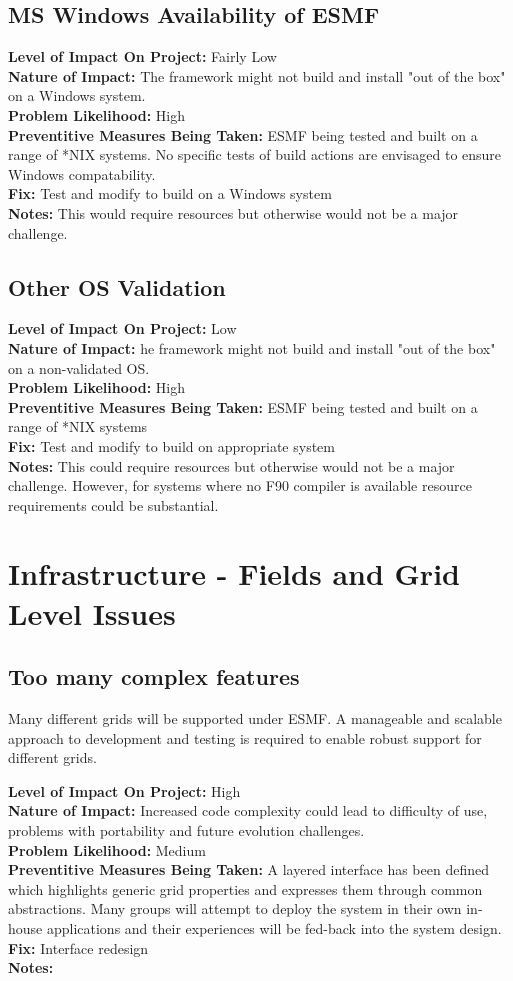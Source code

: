 \documentclass[english]{article}
\newcommand{\req}[1]{\section{\hspace{.2in}#1}}
\newcommand{\sreq}[1]{\subsection{\hspace{.2in}#1}}
\newenvironment
{reqlist}
{\begin{list} {} {} \rm \item[]}
{\end{list}}
\begin{document}
\sreq{MS Windows Availability of ESMF}
\begin{reqlist}
{\bf Level of Impact On Project:} Fairly Low \\
{\bf Nature of Impact:} The framework might not build and install "out of the box"
on a Windows system.\\
{\bf Problem Likelihood:} High \\
{\bf Preventitive Measures Being Taken:}  ESMF being tested and built on a range of *NIX systems.
No specific tests of build actions are envisaged to ensure Windows compatability.\\
{\bf Fix:} Test and modify to build on a Windows system\\
{\bf Notes:} This would require resources but otherwise would not be a major challenge.
\end{reqlist}

\sreq{Other OS Validation}
\begin{reqlist}
{\bf Level of Impact On Project:} Low \\
{\bf Nature of Impact:} he framework might not build and install "out of the box"
on a non-validated OS.\\
{\bf Problem Likelihood:} High \\
{\bf Preventitive Measures Being Taken:} ESMF being tested and built on a range of *NIX systems\\
{\bf Fix:}  Test and modify to build on appropriate system\\
{\bf Notes:} This could require resources but otherwise would not be a major challenge.
However, for systems where no F90 compiler is available resource requirements could be substantial.
\end{reqlist}

\req{Infrastructure - Fields and Grid Level Issues}
\sreq{Too many complex features}
Many different grids will be supported under ESMF. A manageable and scalable approach
to development and testing is required to enable robust support for different grids.
\begin{reqlist}
{\bf Level of Impact On Project:} High \\
{\bf Nature of Impact:} Increased code complexity could lead to
difficulty of use, problems with portability and future evolution challenges.\\
{\bf Problem Likelihood:} Medium \\
{\bf Preventitive Measures Being Taken:} A layered interface has been defined 
which highlights generic grid properties and expresses them through common abstractions.
Many groups will attempt to deploy the system in their own in-house
applications and their experiences will be fed-back into the system design.\\
{\bf Fix:} Interface redesign \\
{\bf Notes:} 
\end{reqlist}
\end{document}
